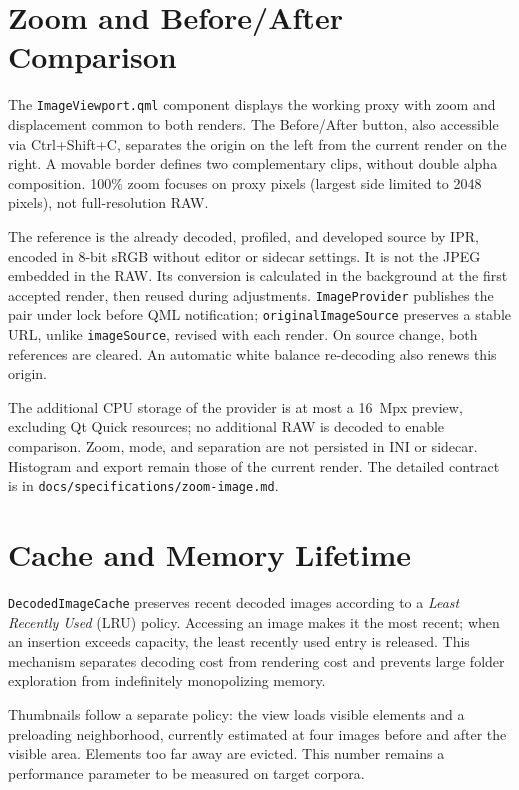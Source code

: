 \section{Zoom and Before/After Comparison}

The \texttt{ImageViewport.qml} component displays the working proxy with zoom and displacement common to both renders. The Before/After button, also accessible via Ctrl+Shift+C, separates the origin on the left from the current render on the right. A movable border defines two complementary clips, without double alpha composition. 100\% zoom focuses on proxy pixels (largest side limited to 2048 pixels), not full-resolution RAW.

The reference is the already decoded, profiled, and developed source by IPR, encoded in 8-bit sRGB without editor or sidecar settings. It is not the JPEG embedded in the RAW. Its conversion is calculated in the background at the first accepted render, then reused during adjustments. \texttt{ImageProvider} publishes the pair under lock before QML notification; \texttt{originalImageSource} preserves a stable URL, unlike \texttt{imageSource}, revised with each render. On source change, both references are cleared. An automatic white balance re-decoding also renews this origin.

The additional CPU storage of the provider is at most a 16~Mpx preview, excluding Qt Quick resources; no additional RAW is decoded to enable comparison. Zoom, mode, and separation are not persisted in INI or sidecar. Histogram and export remain those of the current render. The detailed contract is in \texttt{docs/specifications/zoom-image.md}.

\section{Cache and Memory Lifetime}

\texttt{DecodedImageCache} preserves recent decoded images according to a \emph{Least Recently Used} (LRU) policy. Accessing an image makes it the most recent; when an insertion exceeds capacity, the least recently used entry is released. This mechanism separates decoding cost from rendering cost and prevents large folder exploration from indefinitely monopolizing memory.

Thumbnails follow a separate policy: the view loads visible elements and a preloading neighborhood, currently estimated at four images before and after the visible area. Elements too far away are evicted. This number remains a performance parameter to be measured on target corpora.

